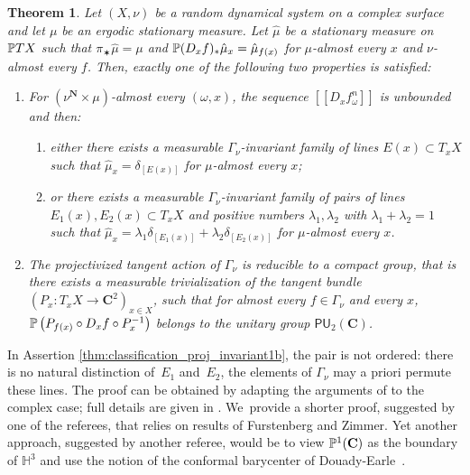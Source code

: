 \documentclass[11pt]{article}
\newcommand{\llbracket}{[\![}
\newcommand{\rrbracket}{]\!]}
\newcommand{\lrpar}[1]{\left(#1\right)}
\newcommand{\inv}{^{-1}}
\def\C{\mathbf{C}}
\def\N{\mathbf{N}}
\theoremstyle{plain}
\newtheorem{thm}{Theorem}[section]
\theoremstyle{definition}
\numberwithin{equation}{section}
\begin{document}
\begin{thm}\label{thm:classification_proj_invariant}
Let $(X, \nu)$ be a random dynamical system on a complex
surface and let $\mu$ be an ergodic stationary measure. Let
$\hat\mu$ be a stationary measure on $\P TX$ such that $\pi_\varstar {\hat{\mu}}=\mu$ and $\P(D_xf)_\varstar \hat\mu_x = \hat\mu_{f(x)}$
for $\mu$-almost every $x$ and $\nu$-almost every $f$. Then, exactly one of the following two properties is satisfied:
\begin{enumerate}
\item\label{thm:classification_proj_invariant1} For $(\nu^\N\times \mu)$-almost every
$(\omega, x)$, the sequence $\llbracket D_xf^n_\omega\rrbracket$
is unbounded and then:
\begin{enumerate}
\item\label{thm:classification_proj_invariant1a} either there exists a measurable $\Gamma_\nu$-invariant family of lines
$E(x)\subset T_xX$ such that $\hat\mu_x=\delta_{[E(x)]}$ for $\mu$-almost every $x$;
\item\label{thm:classification_proj_invariant1b} or there exists a measurable $\Gamma_\nu$-invariant family of pairs of lines
$E_1(x), E_2(x) \subset T_xX$ and positive numbers $ \lambda_1, \lambda_2$ with
$\lambda_1+\lambda_2 =1$ such that $\hat\mu_x=\lambda_1\delta_{[E_1(x)]} + \lambda_2\delta_{[E_2(x)]}$ for $\mu$-almost every $x$.
\end{enumerate}
\item\label{thm:classification_proj_invariant2} The projectivized tangent action of $\Gamma_\nu$ is reducible to a compact group, that is
there exists a measurable trivialization
of the tangent bundle $(P_x: T_xX \to \C^2)_{x\in X}$, such that for almost
every $f\in \Gamma_\nu$ and every
$x$, $\P\lrpar{P_{f(x)}\circ D_xf\circ P_x\inv}$ belongs to the unitary group $\mathsf{PU}_2(\C)$.
\end{enumerate}
\end{thm}

In Assertion \eqref{thm:classification_proj_invariant1b}, the pair is not ordered: there is no natural distinction of~$E_1$ and~$E_2$,
the elements of $\Gamma_\nu$ may a priori permute these lines.
The proof can be obtained by adapting the arguments of \cite{barrientos-malicet} to the complex case;
full details are given in \cite[\S 7.4]{arxiv-version-of-this-paper}. We~provide a shorter
proof, suggested by
one of the referees, that relies on results of Furstenberg and Zimmer.
Yet another approach, suggested by
another referee, would be to view $\P^1(\C)$ as the boundary of $\mathbb H^3$ and use the notion
of the conformal barycenter of Douady-Earle~\cite{douady-earle}.
\end{document}
